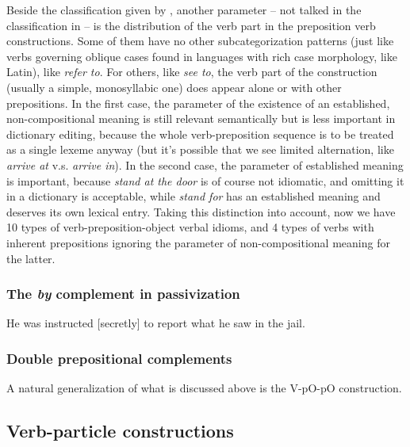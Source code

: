 \documentclass[UTF8, a4paper, oneside, scheme=plain, 12pt]{ctexbook}
\newcommand*{\citepage}[1]{p.~{#1}}
\newcommand{\form}[1]{\emph{#1}}
\begin{document}
Beside the classification given by ,
another parameter -- not talked in the classification in \citet{cgel}
-- is the distribution of the verb part in the preposition verb constructions.
Some of them have no other subcategorization patterns
(just like verbs governing oblique cases found in languages with rich case morphology, like Latin),
like \form{refer to}.
For others, like \form{see to},
the verb part of the construction (usually a simple, monosyllabic one)
does appear alone or with other prepositions.
In the first case,
the parameter of the existence of an established, 
non-compositional meaning 
is still relevant semantically \citep[\citepage{291}]{dixon2005semantic} 
but is less important in dictionary editing,
because the whole verb-preposition sequence is to be treated as a single lexeme anyway 
(but it's possible that we see limited alternation, 
like \form{arrive at} v.s. \form{arrive in}).
In the second case,
the parameter of established meaning is important,
because \form{stand at the door} is of course not idiomatic,
and omitting it in a dictionary is acceptable,
while \form{stand for} has an established meaning
and deserves its own lexical entry.
Taking this distinction into account, 
now we have 10 types of verb-preposition-object verbal idioms,
and 4 types of verbs with inherent prepositions 
ignoring the parameter of non-compositional meaning for the latter.

\subsubsection{The \form{by} complement in passivization}\label{sec:valency.overview.by-phrase}

\begin{exe}
    \ex He was instructed [secretly] to report what he saw in the jail.
\end{exe}

\subsubsection{Double prepositional complements}

A natural generalization of what is discussed above is 
the V-pO-pO construction.

\subsection{Verb-particle constructions}\label{sec:vp.valence.verb-particle}
\end{document}
